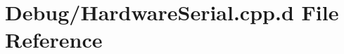 \hypertarget{_debug_2_hardware_serial_8cpp_8d}{\section{\-Debug/\-Hardware\-Serial.cpp.\-d \-File \-Reference}
\label{_debug_2_hardware_serial_8cpp_8d}
}

